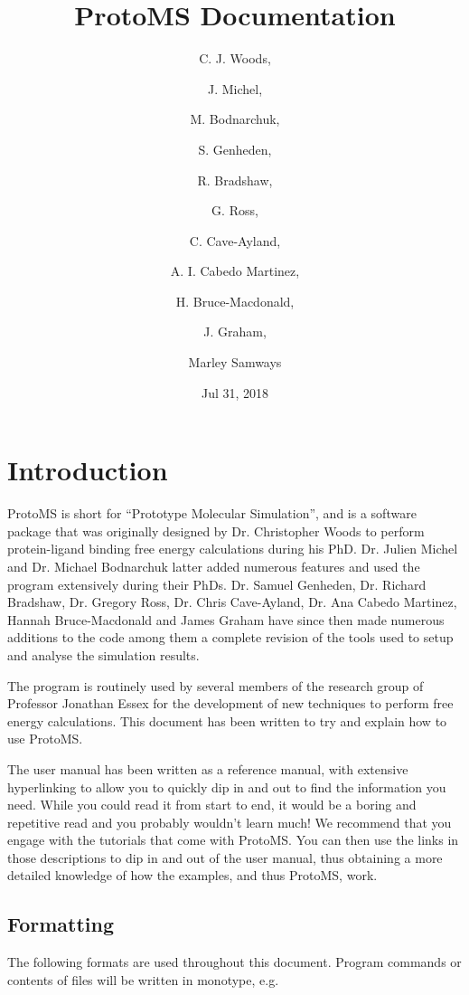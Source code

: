 \documentclass[letterpaper,10pt,english]{sphinxmanual}
\title{ProtoMS Documentation}
\date{Jul 31, 2018}
\author{C. J. Woods, \and J. Michel, \and M. Bodnarchuk, \and S. Genheden, \and R. Bradshaw, \and G. Ross, \and C. Cave-Ayland, \and A. I. Cabedo Martinez, \and H. Bruce-Macdonald, \and J. Graham, \and Marley Samways}
\begin{document}
\maketitle
\sphinxtableofcontents
{}\label{\detokenize{index::doc}}



\chapter{Introduction}
\label{\detokenize{introduction:introduction}}\label{\detokenize{introduction::doc}}
ProtoMS is short for “Prototype Molecular Simulation”, and is a software package that was originally designed by Dr. Christopher Woods to perform protein-ligand binding free energy calculations during his PhD. Dr. Julien Michel and Dr. Michael Bodnarchuk latter added numerous features and used the program extensively during their PhDs. Dr. Samuel Genheden, Dr. Richard Bradshaw, Dr. Gregory Ross, Dr. Chris Cave-Ayland, Dr. Ana Cabedo Martinez, Hannah Bruce-Macdonald and James Graham have since then made numerous additions to the code among them a complete revision of the tools used to setup and analyse the simulation results.

The program is routinely used by several members of the research group of Professor Jonathan Essex for the development of new techniques to perform free energy calculations. This document has been written to try and explain how to use ProtoMS.

The user manual has been written as a reference manual, with extensive hyperlinking to allow you to quickly dip in and out to find the information you need. While you could read it from start to end, it would be a boring and repetitive read and you probably wouldn’t learn much! We recommend that you engage with the tutorials that come with ProtoMS. You can then use the links in those descriptions to dip in and out of the user manual, thus obtaining a more detailed knowledge of how the examples, and thus ProtoMS, work.


\section{Formatting}
\label{\detokenize{introduction:formatting}}
The following formats are used throughout this document. Program commands or contents of files will be written in monotype, e.g.

%
\begin{sphinxVerbatim}[commandchars=\\\{\}]
 
\end{sphinxVerbatim}
\end{document}
